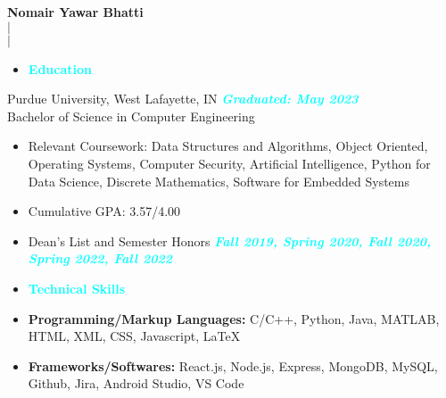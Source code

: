 \documentclass{article}
\begin{document}
\begin{center}
    \Large{\textbf{Nomair Yawar Bhatti \\}}
    \normalsize{ $\mid$  \\}
    \normalsize{ $\mid$  \\} 
\end{center}

\begin{itemize}[noitemsep, nolistsep, leftmargin = *]
    \item[\textcolor{cyan}{\ding{228}}]\Large{\textcolor{cyan}{\textbf{Education}}}
    \hrulefill
\end{itemize}
Purdue University, West Lafayette, IN \hfill \textit{\textcolor{cyan}{\textbf{Graduated: May 2023}}} \\
Bachelor of Science in Computer Engineering
\begin{itemize}[noitemsep, nolistsep]
    \item Relevant Coursework: Data Structures and Algorithms, Object Oriented, Operating Systems, Computer Security, Artificial Intelligence, Python for Data Science, Discrete Mathematics, Software for Embedded Systems
    \item Cumulative GPA: 3.57/4.00
    \item Dean's List and Semester Honors \hfill \textit{\textcolor{cyan}{\textbf{Fall 2019, Spring 2020, Fall 2020, Spring 2022, Fall 2022}}} \\
\end{itemize}

\begin{itemize}[noitemsep, nolistsep, leftmargin = *]
    \item[\textcolor{cyan}{\ding{228}}]\Large{\textcolor{cyan}{\textbf{Technical Skills}}}
    \hrulefill
\end{itemize}
\begin{itemize}[noitemsep, nolistsep, leftmargin = *]
    \item \textbf{Programming/Markup Languages:} C/C++, Python, Java, MATLAB, HTML, XML, CSS, Javascript, LaTeX 
    \item \textbf{Frameworks/Softwares:} React.js, Node.js, Express, MongoDB, MySQL, Github, Jira, Android Studio, VS Code\\
\end{itemize}
\end{document}
